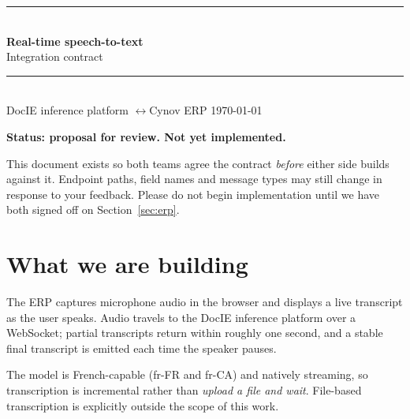 \documentclass[11pt,a4paper]{article}
\begin{document}
\thispagestyle{empty}

\begin{flushleft}
{\color{accent}\rule{\textwidth}{2.2pt}}\\[1.1em]
{\Huge\bfseries Real-time speech-to-text}\\[0.45em]
{\Large\color{muted} Integration contract}\\[1.1em]
{\color{hairline}\rule{\textwidth}{0.6pt}}\\[0.7em]
{\small\color{muted}
DocIE inference platform \quad$\longleftrightarrow$\quad Cynov ERP \hfill \today}
\end{flushleft}

\vspace{1.3em}

\begin{statusbox}
\textbf{Status: proposal for review. Not yet implemented.}\par\smallskip
This document exists so both teams agree the contract \emph{before} either side builds
against it. Endpoint paths, field names and message types may still change in response
to your feedback. Please do not begin implementation until we have both signed off on
Section~\ref{sec:erp}.
\end{statusbox}

\vspace{0.6em}

\section{What we are building}

The ERP captures microphone audio in the browser and displays a live transcript as the
user speaks. Audio travels to the DocIE inference platform over a WebSocket; partial
transcripts return within roughly one second, and a stable final transcript is emitted
each time the speaker pauses.

The model is French-capable (fr-FR and fr-CA) and natively streaming, so transcription is
incremental rather than \emph{upload a file and wait}. File-based transcription is
explicitly outside the scope of this work.
\end{document}
